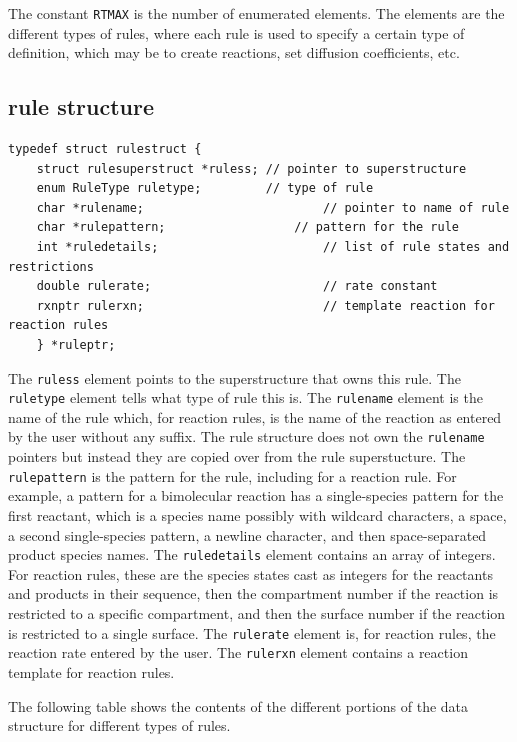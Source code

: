 \documentclass {scrbook}
\newcommand {\ttt} {\texttt}
\begin{document}
The constant \ttt{RTMAX} is the number of enumerated elements. The elements are the different types of rules, where each rule is used to specify a certain type of definition, which may be to create reactions, set diffusion coefficients, etc.

\subsection{rule structure}

\begin{lstlisting}
typedef struct rulestruct {
	struct rulesuperstruct *ruless;	// pointer to superstructure
	enum RuleType ruletype;			// type of rule
	char *rulename;							// pointer to name of rule
	char *rulepattern;					// pattern for the rule
	int *ruledetails;						// list of rule states and restrictions
	double rulerate;						// rate constant
	rxnptr rulerxn;							// template reaction for reaction rules
	} *ruleptr;
\end{lstlisting}

The \ttt{ruless} element points to the superstructure that owns this rule. The \ttt{ruletype} element tells what type of rule this is. The \ttt{rulename} element is the name of the rule which, for reaction rules, is the name of the reaction as entered by the user without any suffix. The rule structure does not own the \ttt{rulename} pointers but instead they are copied over from the rule superstucture. The \ttt{rulepattern} is the pattern for the rule, including for a reaction rule. For example, a pattern for a bimolecular reaction has a single-species pattern for the first reactant, which is a species name possibly with wildcard characters, a space, a second single-species pattern, a newline character, and then space-separated product species names. The \ttt{ruledetails} element contains an array of integers. For reaction rules, these are the species states cast as integers for the reactants and products in their sequence, then the compartment number if the reaction is restricted to a specific compartment, and then the surface number if the reaction is restricted to a single surface. The \ttt{rulerate} element is, for reaction rules, the reaction rate entered by the user. The \ttt{rulerxn} element contains a reaction template for reaction rules.

The following table shows the contents of the different portions of the data structure for different types of rules.
\end{document}
